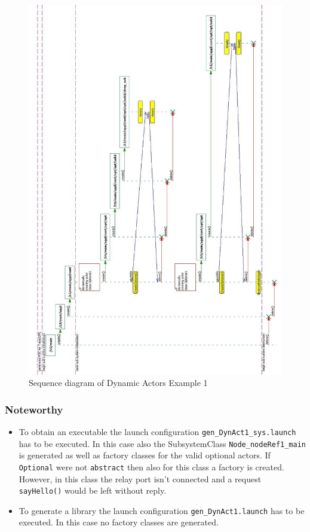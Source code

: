 \begin{figure}
\includegraphics[scale=0.45]{images/039-DynAct1-MSC.jpg}
\caption{Sequence diagram of Dynamic Actors Example 1}
\label{fig:dynact1_msc}
\end{figure}

\subsubsection{Noteworthy}

\begin{itemize}
\item To obtain an executable the launch configuration \texttt{gen\_DynAct1\_sys.launch} has to be executed.
In this case also the SubsystemClass \texttt{Node\_nodeRef1\_main} is generated as well as factory classes
for the valid optional actors. If \texttt{Optional} were not \texttt{abstract} then also for this class
a factory is created. However, in this class the relay port isn't connected and a request \texttt{sayHello()}
would be left without reply.
\item To generate a library the launch configuration \texttt{gen\_DynAct1.launch} has to be executed.
In this case no factory classes are generated.
\end{itemize}


